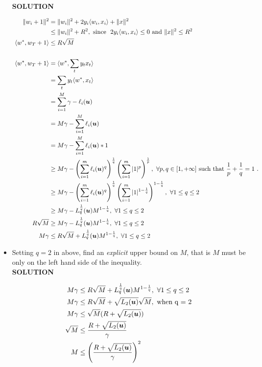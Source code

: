 \documentclass{article}
\begin{document}
\begin{itemize}
\textbf{SOLUTION}
\begin{mdframed}[backgroundcolor=lightgray]
\begin{align*}
   \|w_i+1\|^2  & = \|w_i\|^2 + 2 y_i \langle w_i, x_i \rangle + \|x\|^2 \\
   & \leq \|w_i\|^2 + R^2  , \text{ since } \ 2 y_i \langle w_i, x_i \rangle \leq 0 \text{ and  } \|x\|^2 \leq R^2 \\ 
   \ \langle w^*, w_T+1 \rangle & \leq R\sqrt{M} \\
   \\
   \ \langle w^*, w_T+1 \rangle & = \langle w^*,\sum _t  y_t x_t \rangle \\
   \ & = \sum _t y_t \langle w^*, x_t \rangle \\
   \ & = \sum_{i=1}^M \gamma - \ell_i(\bu) \\
   \ & = M \gamma - \sum_{i=1}^M \ell_i(\bu) \\
   \ & = M \gamma - \sum_{i=1}^M \ell_i(\bu) * 1 \\
   \ & \geq M \gamma - \left(\sum_{i=1}^m \ell_i(\bu)^q\right)^\frac{1}{q} \left(\sum_{i=1}^m |1|^p\right)^\frac{1}{p}, \ \forall p,q\in[1,+\infty] \text{ such that } \frac{1}{p}+\frac{1}{q}=1~. \\
   \ & \geq M \gamma - \left(\sum_{i=1}^m \ell_i(\bu)^q\right)^\frac{1}{q} \left(\sum_{i=1}^m |1|^{1-\frac{1}{q}}\right)^{1-\frac{1}{q}} , \ \forall 1 \leq q\leq 2 \\
   \ & \geq M \gamma - L^\frac{1}{q}_q(\bu) M^{1-\frac{1}{q}} , \ \forall 1 \leq q\leq 2 \\
   R\sqrt{M} & \geq M \gamma - L^\frac{1}{q}_q(\bu) M^{1-\frac{1}{q}} , \ \forall 1 \leq q\leq 2 \\ 
   M \gamma & \leq R\sqrt{M} + L^\frac{1}{q}_q(\bu) M^{1-\frac{1}{q}} , \ \forall 1 \leq q\leq 2 \\ 
\end{align*}  
\end{mdframed}

\item Setting $q=2$ in above, find an \emph{explicit} upper bound on $M$, that is $M$ must be only on the left hand side of the inequality.\\
\textbf{SOLUTION}
\begin{mdframed}[backgroundcolor=lightgray]
 \begin{align*}
M \gamma & \leq R\sqrt{M} + L^\frac{1}{q}_q(\boldsymbol{u}) M^{1-\frac{1}{q}} , \ \forall 1 \leq q\leq 2 \\ 
M \gamma & \leq R\sqrt{M} + \sqrt{L_2(\boldsymbol{u})} \sqrt{M} , \text{ when q = 2 } \\ 
M \gamma & \leq \sqrt{M} (R + \sqrt{L_2(\boldsymbol{u})}) \\ 
\sqrt{M}  & \leq \frac{R + \sqrt{L_2(\boldsymbol{u})}} {\gamma} \\ 
M  & \leq {\left({\frac{R + \sqrt{L_2(\boldsymbol{u})}} {\gamma} }\right)}^2
\end{align*}
\end{mdframed}
\end{itemize}
\end{document}

